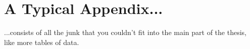 \chapter{A Typical Appendix...}

...consists of all the junk that you couldn't fit into the main part of the thesis, like more tables of data.
